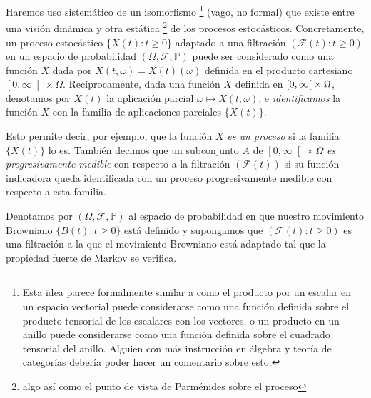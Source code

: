 \documentclass{article}
\newcommand{\leftOpenInterval}{\left]}
\newcommand{\rightOpenInterval}{\right[}
\newcommand{\leftClosedInterval}{\left[}
\newcommand{\rightClosedInterval}{\right]}
\newcommand{\interval}[3]{%
    \ifstrequal{#1}{oo}{%
      \leftOpenInterval #2, #3 \rightOpenInterval%
    }{%
      \ifstrequal{#1}{co}{%
        \leftClosedInterval #2, #3 \rightOpenInterval%
      }{%
        \ifstrequal{#1}{oc}{
          \leftOpenInterval #2, #3 \rightClosedInterval%
        }{%
          \ifstrequal{#1}{cc}{
            \leftClosedInterval #2, #3 \rightClosedInterval
          }{%
          }%
        }%
      }%
    }%
  }
\newcommand{\prob}{\mathbb{P}}
\newcommand{\events}{\mathcal{F}}
\newcommand{\brownian}{B}
\theoremstyle{plain}
\theoremstyle{remark}
\theoremstyle{definition}
\begin{document}
Haremos uso sistemático de un isomorfismo%
\footnote{Esta idea parece formalmente similar a como el producto por un escalar en un espacio vectorial puede considerarse como una función definida sobre el producto tensorial de los escalares con los vectores, o un producto en un anillo puede considerarse como una función definida sobre el cuadrado tensorial del anillo.
Alguien con más instrucción en álgebra y teoría de categorías debería poder hacer un comentario sobre esto.}
(vago, no formal) que existe entre una visión dinámica y otra estática%
\footnote{algo así como el punto de vista de Parménides sobre el proceso}
de los procesos estocásticos.
Concretamente, un proceso estocástico \(\{X(t) : t \geq 0\}\) adaptado a una filtración \((\events(t) : t \geq 0)\) en un espacio de probabilidad \((\Omega, \events, \prob)\) puede ser considerado como una función \(X\) dada por \(X(t, \omega) = X(t)(\omega)\) definida en el producto cartesiano \(\left[ 0, \infty \right[ \times \Omega\).
Recíprocamente, dada una función \(X\) definida en \(\interval{co}{0}{\infty} \times \Omega\), denotamos por \(X(t)\) la aplicación parcial \(\omega \mapsto X(t, \omega)\), e \emph{identificamos} la función \(X\) con la familia de aplicaciones parciales \(\{X(t)\}\).

Esto permite decir, por ejemplo, que la función \(X\) \emph{es un proceso} si la familia \(\{X(t)\}\) lo es.
También decimos que un subconjunto \(A\) de \(\left[ 0, \infty \right[ \times \Omega\) \emph{es progresivamente medible} con respecto a la filtración \((\events(t))\) si su función indicadora queda identificada con un proceso progresivamente medible con respecto a esta familia.



Denotamos por \((\Omega, \events, \prob)\) al espacio de probabilidad en que nuestro movimiento Browniano \(\{\brownian(t) : t \geq 0\}\) está definido y supongamos que \((\events(t) : t \geq 0)\) es una filtración a la que el movimiento Browniano está adaptado tal que la propiedad fuerte de Markov se verifica.
\end{document}
